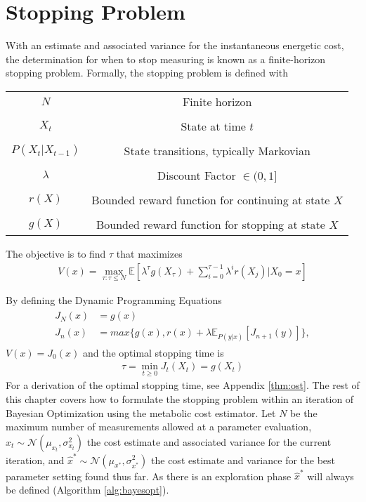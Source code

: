 \section{Stopping Problem}
With an estimate and associated variance for the instantaneous energetic cost, the determination for when to stop measuring is known as a finite-horizon stopping problem. Formally, the stopping problem is defined with

\begin{table}[h]
\centering
\begin{tabular}{ c  c }
  $N$ & Finite horizon\\\\
  $X_t$ & State at time $t$\\\\
  $P(X_t \vert X_{t-1})$ & State transitions, typically Markovian\\\\
  $\lambda$ & Discount Factor $\in (0, 1]$\\\\
  $r(X)$ & Bounded reward function for continuing at state $X$\\\\
  $g(X)$ & Bounded reward function for stopping at state $X$
\end{tabular}
\end{table}

The objective is to find $\tau$ that maximizes
\begin{align}
  V(x) = \max_{\tau: \tau \leq N} \mathbb{E}[\lambda^{\tau} g(X_{\tau}) + \sum_{i=0}^{\tau-1} \lambda^{i}r(X_j) \vert X_0 = x]
\end{align}

By defining the Dynamic Programming Equations
\begin{align}
\begin{split}
  J_N(x) &= g(x)\\
  J_n(x) &= max\{g(x), r(x) + \lambda\mathbb{E}_{P(y\vert x)}[J_{n+1}(y)]\},
\end{split}
\end{align}
$V(x) = J_0(x)$ and the optimal stopping time is
\begin{align}
  \tau = \min_{t \geq 0}J_t(X_t) = g(X_t)
\end{align}
For a derivation of the optimal stopping time, see Appendix \ref{thm:ost}. The rest of this chapter covers how to formulate the stopping problem within an iteration of Bayesian Optimization using the metabolic cost estimator. Let $N$ be the maximum number of measurements allowed at a parameter evaluation, $\hat{x}_t \sim \mathcal{N}(\mu_{x_t}, \sigma^2_{x_t})$ the cost estimate and associated variance for the current iteration, and $\hat{x}^* \sim \mathcal{N}(\mu_{x^*}, \sigma^2_{x^*})$ the cost estimate and variance for the best parameter setting found thus far. As there is an exploration phase $\hat{x}^*$ will always be defined (Algorithm \ref{alg:bayesopt}).


